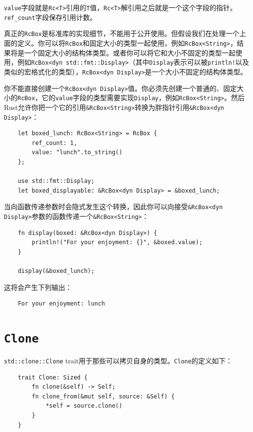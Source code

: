 \texttt{value}字段就是\texttt{Rc<T>}引用的\texttt{T}值，\texttt{Rc<T>}解引用之后就是一个这个字段的指针。\texttt{ref\_count}字段保存引用计数。

真正的\texttt{RcBox}是标准库的实现细节，不能用于公开使用。但假设我们在处理一个上面的定义。你可以将\texttt{RcBox}和固定大小的类型一起使用，例如\texttt{RcBox<String>}，结果将是一个固定大小的结构体类型。或者你可以将它和大小不固定的类型一起使用，例如\texttt{RcBox<dyn std::fmt::Display>}（其中\texttt{Display}表示可以被\texttt{println!}以及类似的宏格式化的类型），\texttt{RcBox<dyn Display>}是一个大小不固定的结构体类型。

你不能直接创建一个\texttt{RcBox<dyn Display>}值。你必须先创建一个普通的、固定大小的\texttt{RcBox}，它的\texttt{value}字段的类型需要实现\texttt{Display}，例如\texttt{RcBox<String>}。然后Rust允许你把一个它的引用\texttt{\&RcBox<String>}转换为胖指针引用\texttt{\&RcBox<dyn Display>}：
\begin{verbatim}
    let boxed_lunch: RcBox<String> = RcBox {
        ref_count: 1,
        value: "lunch".to_string()
    };

    use std::fmt::Display;
    let boxed_displayable: &RcBox<dyn Display> = &boxed_lunch;
\end{verbatim}

当向函数传递参数时会隐式发生这个转换，因此你可以向接受\texttt{\&RcBox<dyn Display>}参数的函数传递一个\texttt{\&RcBox<String>}：
\begin{verbatim}
    fn display(boxed: &RcBox<dyn Display>) {
        println!("For your enjoyment: {}", &boxed.value);
    }

    display(&boxed_lunch);
\end{verbatim}

这将会产生下列输出：
\begin{verbatim}
    For your enjoyment: lunch
\end{verbatim}

\section{\texttt{Clone}}\label{clone}

\texttt{std::clone::Clone} trait用于那些可以拷贝自身的类型。\texttt{Clone}的定义如下：
\begin{verbatim}
    trait Clone: Sized {
        fn clone(&self) -> Self;
        fn clone_from(&mut self, source: &Self) {
            *self = source.clone()
        }
    }
\end{verbatim}

